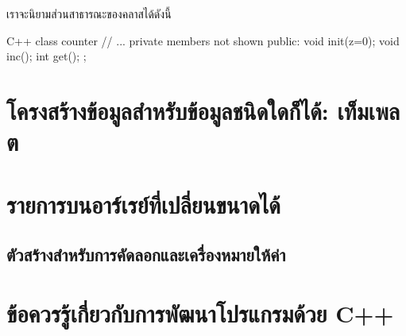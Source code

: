 เรา{\wbr}จะ{\wbr}นิยาม{\wbr}ส่วน{\wbr}สาธารณะ{\wbr}ของ{\wbr}ค{\wbr}ลา{\wbr}ส{\wbr}ได้{\wbr}ดังนี้{\wbr}

\latintext
\begin{codelist}{C++}{}
class counter {
  // ... private members not shown
public:
  void init(z=0);
  void inc();
  int get();
};
\end{codelist}
\thaitext

\section{โครงสร้าง{\wbr}ข้อมูล{\wbr}สำหรับ{\wbr}ข้อมูล{\wbr}ชนิด{\wbr}ใด{\wbr}ก็ได้: เท็ม{\wbr}เพล{\wbr}ต}

\section{รายการ{\wbr}บน{\wbr}อาร์เรย์{\wbr}ที่{\wbr}เปลี่ยน{\wbr}ขนาด{\wbr}ได้}

\subsection{ตัว{\wbr}สร้าง{\wbr}สำหรับ{\wbr}การ{\wbr}คัดลอก{\wbr}และ{\wbr}เครื่องหมาย{\wbr}ให้{\wbr}ค่า}

\section{ข้อ{\wbr}ควร{\wbr}รู้{\wbr}เกี่ยวกับ{\wbr}การ{\wbr}พัฒนา{\wbr}โปรแกรม{\wbr}ด้วย C++}
